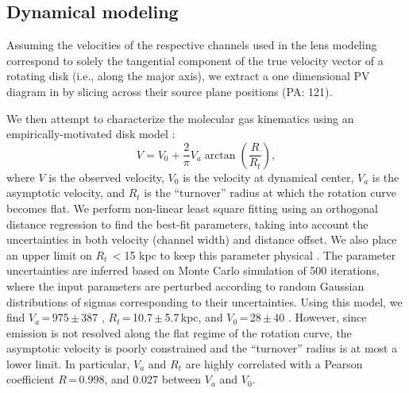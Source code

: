 \documentclass[]{emulateapj}
\begin{document}
\subsection{\bco Dynamical modeling} \label{sec:dynamics} %
Assuming the velocities of the respective channels used in the
lens modeling correspond to solely the tangential component of the
true velocity vector of a rotating disk (i.e., along the major axis),
we extract a one dimensional PV diagram in 
by slicing across their source plane positions (PA: 121\degr).

We then attempt to characterize the molecular gas kinematics using an
empirically-motivated disk model \citep[\eg][]{Courteau97a,Puech08a,Miller11a}:
\begin{equation}
V = V_0 + \frac{2}{\pi} V_{a} \arctan(\frac{R}{R_{t}}),
\end{equation}
where $V$ is the observed velocity, $V_0$ is the velocity at dynamical center,
$V_{a}$ is the asymptotic velocity, and $R_{t}$ is the ``turnover''
radius at which the rotation curve becomes flat.
We perform non-linear least square fitting using an orthogonal distance
regression to find the best-fit parameters,
taking into account the uncertainties in both velocity (channel width) and
distance offset. We also place an upper limit on $R_{t}$\,$<$15 kpc
to keep this parameter physical \citep[\eg][]{Puech08a,Miller11a}.
The parameter uncertainties are inferred based on Monte Carlo simulation
of 500 iterations, where the input parameters are perturbed
according to random Gaussian distributions of sigmas
corresponding to their uncertainties.
Using this model, we find $V_{a}$\,=\,975\,$\pm$\,387 \kms,
$R_{t}$\,=\,10.7\,$\pm$\,5.7\,kpc, and $V_0$\,=\,28\,$\pm$\,40 \kms.
However, since emission is not resolved along the flat regime
of the rotation curve, the asymptotic velocity is poorly constrained and
the ``turnover'' radius is at most a lower limit.
In particular, $V_{a}$ and $R_{t}$ are highly correlated with a
Pearson coefficient $R$\,=\,0.998, and 0.027 between $V_{a}$ and $V_0$.
\end{document}
